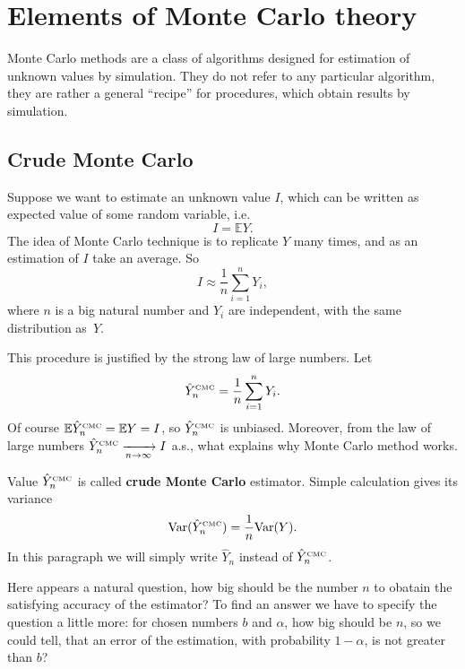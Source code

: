 \documentclass[a4paper,12pt, oneside]{book}
\theoremstyle{definition}
\theoremstyle{remark}
\def\Var{{\rm Var}}
\def\E{{\mathbb{E}}}
\def\conv{\xrightarrow[n \rightarrow \infty]{}}
\def\CMC[#1]{\hat{Y}^{\hbox{\tiny CMC}}_{#1}}
\begin{document}
\section{Elements of Monte Carlo theory}
Monte Carlo methods are a class of algorithms designed for estimation of unknown values by simulation.
They do not refer to any particular algorithm, they are rather a general ``recipe'' for procedures, which obtain results by simulation.

\subsection{Crude Monte Carlo}
Suppose we want to estimate an unknown value $I$, which can be written as expected value of some random variable, i.e.
\begin{equation}
 \label{eq:EY}
 I = \E Y. 
\end{equation}
The idea of Monte Carlo technique is to replicate $Y$ many times, and as an estimation of $I$ take an average. So
\[ I \approx \frac{1}{n} \sum\limits_{i=1}^n Y_i, \]
where $n$ is a big natural number and $Y_i$ are independent, with the same distribution as~$Y$.

This procedure is justified by the strong law of large numbers. Let 
\begin{equation}
 \label{eq:CMC}
 \CMC[n] = \frac{1}{n}\sum\limits_{i=1}^n Y_i.
\end{equation}
Of course $\E\CMC[n] = \E Y = I$, so $\CMC[n]$ is unbiased. Moreover, from the law of large numbers $\CMC[n] \conv I$ a.s., what explains why Monte Carlo method works. 

Value $\CMC[n]$ is called \textbf{crude Monte Carlo} estimator. Simple calculation gives its variance
\begin{equation}
 \label{eq:VarCMC}
 \Var(\CMC[n]) = \frac{1}{n}\Var(Y).
\end{equation}
In this paragraph we will simply write $\hat{Y}_n$ instead of $\CMC[n]$.

Here appears a natural question, how big should be the number $n$ to obatain the satisfying accuracy of the estimator?
To find an answer we have to specify the question a little more: for chosen numbers $b$ and $\alpha$, how big should be $n$, so we could tell, that an error of the estimation, with probability $1-\alpha$, is not greater than $b$?
\end{document}

